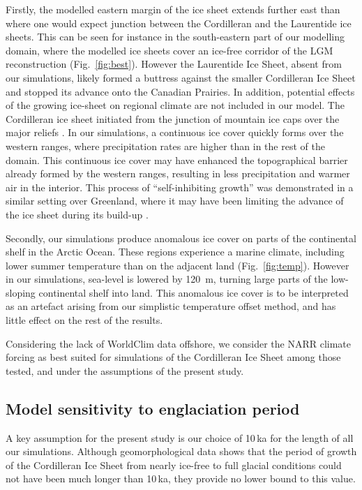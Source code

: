 Firstly, the modelled eastern margin of the ice sheet extends further east than where one would expect junction between the Cordilleran and the Laurentide ice sheets. This can be seen for instance in the south-eastern part of our modelling domain, where the modelled ice sheets cover an ice-free corridor of the LGM reconstruction (Fig.~\ref{fig:best}). However the Laurentide Ice Sheet, absent from our simulations, likely formed a buttress against the smaller Cordilleran Ice Sheet and stopped its advance onto the Canadian Prairies. In addition, potential effects of the growing ice-sheet on regional climate are not included in our model. The Cordilleran ice sheet initiated from the junction of mountain ice caps over the major reliefs \citep{clague-1989}. In our simulations, a continuous ice cover quickly forms over the western ranges, where precipitation rates are higher than in the rest of the domain. This continuous ice cover may have enhanced the topographical barrier already formed by the western ranges, resulting in less precipitation and warmer air in the interior. This process of ``self-inhibiting growth'' was demonstrated in a similar setting over Greenland, where it may have been limiting the advance of the ice sheet during its build-up \citep{langen-etal-2012}.

Secondly, our simulations produce anomalous ice cover on parts of the continental shelf in the Arctic Ocean. These regions experience a marine climate, including lower summer temperature than on the adjacent land (Fig.~\ref{fig:temp}). However in our simulations, sea-level is lowered by 120~m, turning large parts of the low-sloping continental shelf into land. This anomalous ice cover is to be interpreted as an artefact arising from our simplistic temperature offset method, and has little effect on the rest of the results.

Considering the lack of WorldClim data offshore, we consider the NARR climate forcing as best suited for simulations of the Cordilleran Ice Sheet among those tested, and under the assumptions of the present study.

\subsection{Model sensitivity to englaciation period}

A key assumption for the present study is our choice of 10\,ka for the length of all our simulations. Although geomorphological data shows that the period of growth of the Cordilleran Ice Sheet from nearly ice-free to full glacial conditions could not have been much longer than 10\,ka, they provide no lower bound to this value.

